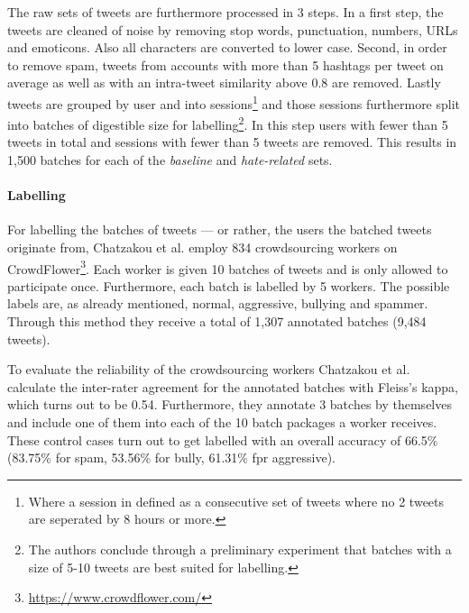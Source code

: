 \documentclass{proseminar}
\begin{document}
The raw sets of tweets are furthermore processed in 3 steps. In a first step, the tweets are cleaned of noise by removing stop words, punctuation, numbers, URLs and emoticons. Also all characters are converted to lower case. Second, in order to remove spam, tweets from accounts with more than 5 hashtags per tweet on average as well as with an intra-tweet similarity above 0.8 are removed. Lastly tweets are grouped by user and into sessions\footnote{Where a session in defined as a consecutive set of tweets where no 2 tweets are seperated by 8 hours or more.} and those sessions furthermore split into batches of digestible size for labelling\footnote{The authors conclude through a preliminary experiment that batches with a size of 5-10 tweets are best suited for labelling.}. In this step users with fewer than 5 tweets in total and sessions with fewer than 5 tweets are removed. This results in 1,500 batches for each of the \emph{baseline} and \emph{hate-related} sets.

\paragraph{Labelling} For labelling the batches of tweets --- or rather, the users the batched tweets originate from, Chatzakou et al. employ 834 crowdsourcing workers on CrowdFlower\footnote{\url{https://www.crowdflower.com/}}. Each worker is given 10 batches of tweets and is only allowed to participate once. Furthermore, each batch is labelled by 5 workers. The possible labels are, as already mentioned, normal, aggressive, bullying and spammer. Through this method they receive a total of 1,307 annotated batches (9,484 tweets).

To evaluate the reliability of the crowdsourcing workers Cha\-tzakou et al. calculate the inter-rater agreement for the annotated batches with Fleiss's kappa, which turns out to be 0.54. Furthermore, they annotate 3 batches by themselves and include one of them into each of the 10 batch packages a worker receives. These control cases turn out to get labelled with an overall accuracy of 66.5\% (83.75\% for spam, 53.56\% for bully, 61.31\% fpr aggressive).
\end{document}
